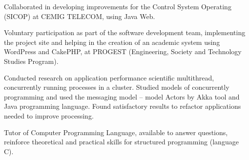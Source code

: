 \documentclass[9pt,a4paper]{altacv}
\begin{document}
\divider


Collaborated in developing improvements for the Control System Operating (SICOP) at CEMIG TELECOM, using Java Web.

\divider


Voluntary participation as part of the software development team, implementing the project site and helping in the creation of an academic system using WordPress and CakePHP, at PROGEST (Engineering, Society and Technology Studies Program).

\divider


Conducted research on application performance scientific multithread, concurrently running processes in a cluster. Studied models of concurrently programming and used the messaging model – model Actors by Akka tool and Java programming language. Found satisfactory results to refactor applications needed to improve processing.

\divider


Tutor of Computer Programming Language, available to answer questions, reinforce theoretical and practical skills for structured programming (language C).




\clearpage

\end{document}
